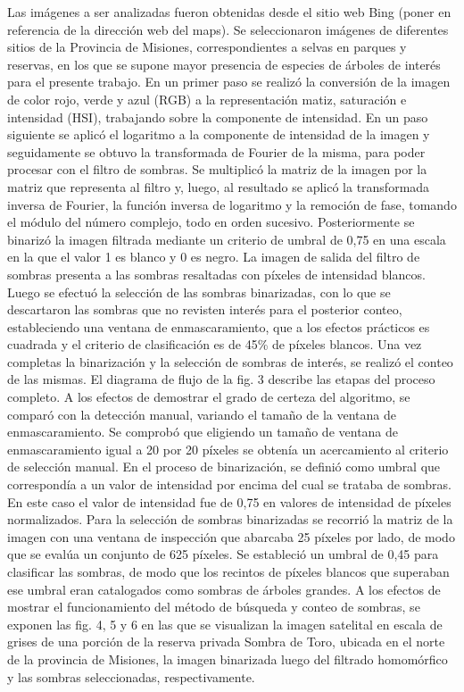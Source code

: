 Las imágenes a ser analizadas fueron obtenidas desde el sitio web Bing (poner en referencia de la dirección web del maps). Se seleccionaron imágenes de diferentes sitios de la Provincia de Misiones, correspondientes a selvas en parques y reservas, en los que se supone mayor presencia de especies de árboles de interés para el presente trabajo. 
En un primer paso se realizó la conversión de la imagen de color rojo, verde y azul (RGB) a la representación matiz, saturación e intensidad (HSI), trabajando sobre la componente de intensidad. En un paso siguiente se aplicó el logaritmo a la componente de intensidad de la imagen y seguidamente se obtuvo la transformada de Fourier de la misma, para poder procesar con el filtro de sombras. Se multiplicó la matriz de la imagen por la matriz que representa al filtro y, luego, al resultado se aplicó la transformada inversa de Fourier, la función inversa de logaritmo y la remoción de fase, tomando el módulo del número complejo, todo en orden sucesivo. Posteriormente se binarizó la imagen filtrada mediante un criterio de umbral de 0,75 en una escala en la que el valor 1 es blanco y 0 es negro. La imagen de salida del filtro de sombras presenta a las sombras resaltadas con píxeles de intensidad blancos. 
Luego se efectuó la selección de las sombras binarizadas, con lo que se descartaron las sombras que no revisten interés para el posterior conteo, estableciendo una ventana de enmascaramiento, que a los efectos prácticos es cuadrada y el criterio de clasificación es de 45\% de píxeles blancos. Una vez completas la binarización y la selección de sombras de interés, se realizó el conteo de las mismas. El diagrama de flujo de la fig. 3 describe las etapas del proceso completo. A los efectos de demostrar el grado de certeza del algoritmo, se comparó con la detección manual, variando el tamaño de la ventana de enmascaramiento. Se comprobó que eligiendo un tamaño de ventana de enmascaramiento igual a 20 por 20 píxeles se obtenía un acercamiento al criterio de selección manual.
En el proceso de binarización, se definió como umbral que correspondía a un valor de intensidad por encima del cual se trataba de sombras. En este caso el valor de intensidad fue de 0,75 en valores de intensidad de píxeles normalizados.
Para la selección de sombras binarizadas se recorrió la matriz de la imagen con una ventana de inspección que abarcaba 25 píxeles por lado, de modo que se evalúa un conjunto de 625 píxeles. Se estableció un umbral de 0,45 para clasificar las sombras, de modo que los recintos de píxeles blancos que superaban ese umbral eran catalogados como sombras de árboles grandes.
A los efectos de mostrar el funcionamiento del método de búsqueda y conteo de sombras, se exponen las fig. 4, 5 y 6 en las que se visualizan la imagen satelital en escala de grises de una porción de la reserva privada Sombra de Toro, ubicada en el norte de la provincia de Misiones, la imagen binarizada luego del filtrado homomórfico y las sombras seleccionadas, respectivamente.


